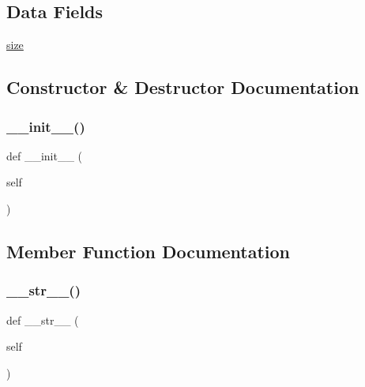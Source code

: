\subsection*{Data Fields}
\begin{DoxyCompactItemize}
\item 
\hyperlink{classvlc_1_1_log_message_aa3d6656320f1a7278c0c2c7fdf07617c}{size}
\end{DoxyCompactItemize}


\subsection{Constructor \& Destructor Documentation}
\mbox{\label{classvlc_1_1_log_message_ae64f0875afe3067b97ba370b354b9213}} 
\subsubsection{\texorpdfstring{\+\_\+\+\_\+init\+\_\+\+\_\+()}{\_\_init\_\_()}}
{\footnotesize\ttfamily def \+\_\+\+\_\+init\+\_\+\+\_\+ (\begin{DoxyParamCaption}\item[{}]{self }\end{DoxyParamCaption})}



\subsection{Member Function Documentation}
\mbox{\label{classvlc_1_1_log_message_a23e8041ce1015febe4fdace3225714f9}} 
\subsubsection{\texorpdfstring{\+\_\+\+\_\+str\+\_\+\+\_\+()}{\_\_str\_\_()}}
{\footnotesize\ttfamily def \+\_\+\+\_\+str\+\_\+\+\_\+ (\begin{DoxyParamCaption}\item[{}]{self }\end{DoxyParamCaption})}

